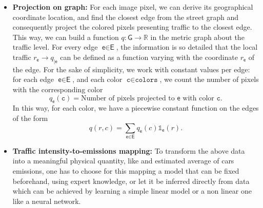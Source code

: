 \documentclass[11pt,a4paper,twoside]{article}
\theoremstyle{definition}
\numberwithin{equation}{section}
\newcommand{\bR}{\ensuremath{\mathbb{R}}}
\newcommand{\G}{\ensuremath{\textsf{G}}} %
\newcommand{\E}{\ensuremath{\textsf{E}}} %
\newcommand{\ee}{\ensuremath{\textsf{e}}}
\newcommand{\<}{\langle}
\renewcommand{\>}{\rangle}
\newcommand{\om}[1]{\textcolor{blue}{#1}}
\begin{document}
\begin{itemize}
      \item \textbf{Projection on graph:} For each image pixel, we can derive its geographical coordinate location, and find the closest edge from the street graph and consequently project the colored pixels presenting traffic to the closest edge. This way, we can build a function $q:\G\to \bR$ in the metric graph about the traffic level. For every edge $\ee\in \E$, the information is so detailed that the local traffic $r_\ee \to q_{|\ee}$ can be defined as a function varying with the coordinate $r_\ee$ of the edge. For the sake of simplicity, we work with constant values per edge: for each edge $\ee\in \E$, and each color $\texttt{c}\in \texttt{colors}$, we count the number of pixels with the corresponding color
      $$
      q_\ee(\texttt{c}) = \text{Number of pixels projected to $\ee$ with color $\texttt{c}$}.
      $$
      In this way, for each color, we have a piecewise constant function on the edges of the form
      \begin{equation}
      q(r,c)=\sum_{\ee\in \E} q_\ee(c) \mathds{1}_\ee(r).
      \label{eq:q}
      \end{equation}
      \item \textbf{Traffic intensity-to-emissions mapping:} To transform the above data into a meaningful physical quantity, like and estimated average of cars emissions, one has to choose for this mapping a model that can be fixed beforehand, using expert knowledge, or let it be inferred directly from data which can be achieved by learning a simple linear model or a non linear one like a neural network.


\end{itemize}
\end{document}
